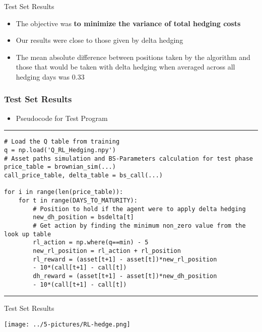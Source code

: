 \documentclass[11pt]{beamer}
\begin{document}
\begin{frame}{Test Set Results}
	\begin{itemize}
		\item The objective was \textbf{to minimize the variance of total hedging costs}
		\item Our results were close to those given by delta hedging
		\item The mean absolute difference between positions taken by the algorithm and those that would be taken with delta hedging when averaged across all hedging days was 0.33
	\end{itemize}
\end{frame}
\begin{frame}[fragile]
\frametitle{Test Set Results}
\scriptsize
	\begin{itemize}
		\item Pseudocode for Test Program
	\end{itemize}

\rule{\textwidth}{1pt}
\begin{verbatim}
# Load the Q table from training
q = np.load('Q_RL_Hedging.npy')  
# Asset paths simulation and BS-Parameters calculation for test phase
price_table = brownian_sim(...)
call_price_table, delta_table = bs_call(...)

for i in range(len(price_table)):
    for t in range(DAYS_TO_MATURITY):
        # Position to hold if the agent were to apply delta hedging 
        new_dh_position = bsdelta[t]
        # Get action by finding the minimum non_zero value from the look up table 
        rl_action = np.where(q==min) - 5 
        new_rl_position = rl_action + rl_position 
        rl_reward = (asset[t+1] - asset[t])*new_rl_position 
        - 10*(call[t+1] - call[t])
        dh_reward = (asset[t+1] - asset[t])*new_dh_position 
        - 10*(call[t+1] - call[t])
\end{verbatim}
\rule{\textwidth}{1pt}
\end{frame}
\begin{frame}{Test Set Results}
\begin{center}
\texttt{[image: ../5-pictures/RL-hedge.png]} 
\end{center}
\end{frame}
\end{document}
